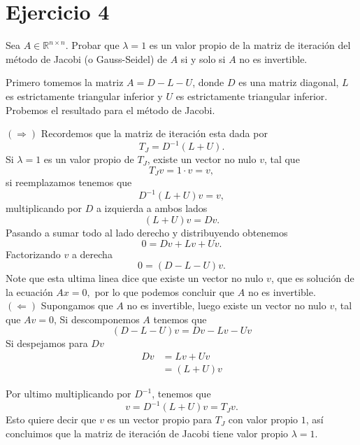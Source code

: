
\section*{Ejercicio 4}
Sea $A \in \mathbb{R}^{n \times n}$. Probar que $\lambda = 1$ es un valor propio de la matriz de iteración del método de Jacobi (o Gauss-Seidel) de $A$ si y solo si $A$ no es invertible.
\begin{sproof}
    Primero tomemos la matriz $A=D-L-U$, donde $D$ es una matriz diagonal, $L$ es estrictamente triangular inferior y $U$ es estrictamente triangular inferior.
       Probemos el resultado para el método de Jacobi.

       $(\Rightarrow)$ Recordemos que la matriz de iteración esta dada por 
       $$T_J=D^{-1}(L+U).$$
       Si $\lambda=1$ es un valor propio de $T_J$, existe un vector no nulo $v$, tal que
       $$T_Jv=1\cdot v=v,$$
       si reemplazamos tenemos que
       $$D^{-1}(L+U)v=v,$$
       multiplicando por $D$ a izquierda a ambos lados
       $$(L+U)v=Dv.$$
       Pasando a sumar todo al lado derecho y distribuyendo obtenemos
       $$0=Dv+Lv+Uv.$$
       Factorizando $v$ a derecha
       $$0=(D-L-U)v.$$
       Note que esta ultima linea dice que existe un vector no nulo $v$, que es solución de la ecuación $Ax=0,$ por lo que podemos concluir que $A$ no es invertible.\\
       $(\Leftarrow)$ Supongamos que $A$ no es invertible, luego existe un vector no nulo $v$, tal que $Av=0$, Si descomponemos $A$ tenemos que
       $$(D-L-U)v=Dv-Lv-Uv$$
       Si despejamos para $Dv$
       \begin{align*}
           Dv&=Lv+Uv\\
           &=(L+U)v
       \end{align*}

       Por ultimo multiplicando por $D^{-1}$, tenemos que
       $$v=D^{-1}(L+U)v=T_Jv.$$
       Esto quiere decir que $v$ es un vector propio para $T_J$ con valor propio $1$, así concluimos que la matriz de iteración de Jacobi tiene valor propio $\lambda=1.$


\end{sproof}
